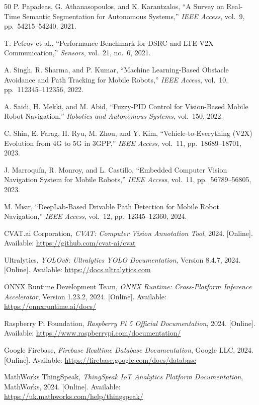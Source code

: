 \begin{thebibliography}{50}
P. Papadeas, G. Athanasopoulos, and K. Karantzalos,
``A Survey on Real-Time Semantic Segmentation for Autonomous Systems,''
\textit{IEEE Access},
vol.~9, pp.~54215--54240, 2021.

T. Petrov et al.,
``Performance Benchmark for DSRC and LTE-V2X Communication,''
\textit{Sensors},
vol.~21, no.~6, 2021.

A. Singh, R. Sharma, and P. Kumar,
``Machine Learning-Based Obstacle Avoidance and Path Tracking for Mobile Robots,''
\textit{IEEE Access},
vol.~10, pp.~112345--112356, 2022.

A. Saidi, H. Mekki, and M. Abid,
``Fuzzy-PID Control for Vision-Based Mobile Robot Navigation,''
\textit{Robotics and Autonomous Systems},
vol.~150, 2022.

C. Shin, E. Farag, H. Ryu, M. Zhou, and Y. Kim,
``Vehicle-to-Everything (V2X) Evolution from 4G to 5G in 3GPP,''
\textit{IEEE Access},
vol.~11, pp.~18689--18701, 2023.

J. Marroqu\'{i}n, R. Monroy, and L. Castillo,
``Embedded Computer Vision Navigation System for Mobile Robots,''
\textit{IEEE Access},
vol.~11, pp.~56789--56805, 2023.

M. M\i s\i r,
``DeepLab-Based Drivable Path Detection for Mobile Robot Navigation,''
\textit{IEEE Access},
vol.~12, pp.~12345--12360, 2024.

CVAT.ai Corporation,
\textit{CVAT: Computer Vision Annotation Tool},
2024.
[Online]. Available: \url{https://github.com/cvat-ai/cvat}

Ultralytics,
\textit{YOLOv8: Ultralytics YOLO Documentation},
Version 8.4.7, 2024.
[Online]. Available: \url{https://docs.ultralytics.com}

ONNX Runtime Development Team,
\textit{ONNX Runtime: Cross-Platform Inference Accelerator},
Version 1.23.2, 2024.
[Online]. Available: \url{https://onnxruntime.ai/docs/}

Raspberry Pi Foundation,
\textit{Raspberry Pi 5 Official Documentation},
2024.
[Online]. Available: \url{https://www.raspberrypi.com/documentation/}

Google Firebase,
\textit{Firebase Realtime Database Documentation},
Google LLC, 2024.
[Online]. Available: \url{https://firebase.google.com/docs/database}

MathWorks ThingSpeak,
\textit{ThingSpeak IoT Analytics Platform Documentation},
MathWorks, 2024.
[Online]. Available: \url{https://uk.mathworks.com/help/thingspeak/}


\end{thebibliography}
